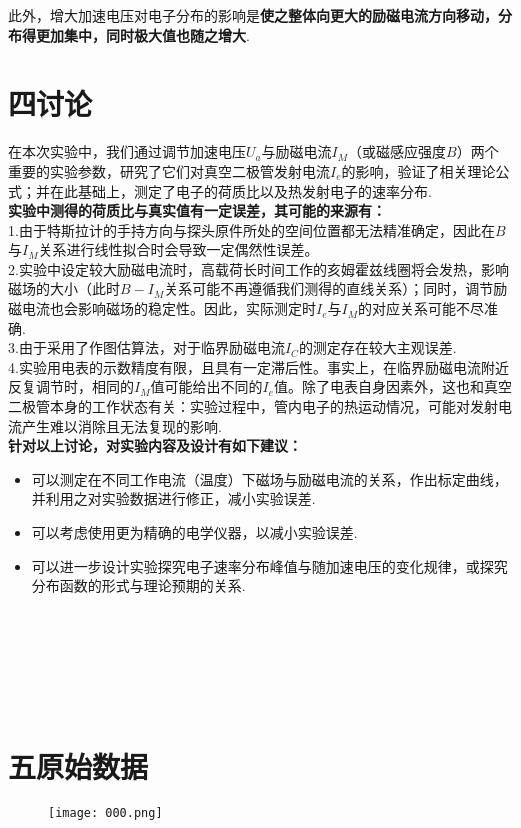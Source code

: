 \documentclass{ctexart}
\begin{document}
\noindent 此外，增大加速电压对电子分布的影响是\textbf{使之整体向更大的励磁电流方向移动，分布得更加集中，同时极大值也随之增大}.
  
\section*{四\quad 讨论}
在本次实验中，我们通过调节加速电压$U_a$与励磁电流$I_M$（或磁感应强度$B$）两个重要的实验参数，研究了它们对真空二极管发射电流$I_e$的影响，验证了相关理论公式；并在此基础上，测定了电子的荷质比以及热发射电子的速率分布.\\ 
\noindent \textbf{实验中测得的荷质比与真实值有一定误差，其可能的来源有：}\\
\noindent 1.由于特斯拉计的手持方向与探头原件所处的空间位置都无法精准确定，因此在$B$与$I_M$关系进行线性拟合时会导致一定偶然性误差。\\
\noindent 2.实验中设定较大励磁电流时，高载荷长时间工作的亥姆霍兹线圈将会发热，影响磁场的大小（此时$B-I_M$关系可能不再遵循我们测得的直线关系）；同时，调节励磁电流也会影响磁场的稳定性。因此，实际测定时$I_e$与$I_M$的对应关系可能不尽准确.\\
\noindent 3.由于采用了作图估算法，对于临界励磁电流$I_C$的测定存在较大主观误差.\\
\noindent 4.实验用电表的示数精度有限，且具有一定滞后性。事实上，在临界励磁电流附近反复调节时，相同的$I_M$值可能给出不同的$I_e$值。除了电表自身因素外，这也和真空二极管本身的工作状态有关：实验过程中，管内电子的热运动情况，可能对发射电流产生难以消除且无法复现的影响.\\
\clearpage
\textbf{针对以上讨论，对实验内容及设计有如下建议：}
\begin{itemize}
  \item 可以测定在不同工作电流（温度）下磁场与励磁电流的关系，作出标定曲线，并利用之对实验数据进行修正，减小实验误差.\\
  \item 可以考虑使用更为精确的电学仪器，以减小实验误差.\\
  \item 可以进一步设计实验探究电子速率分布峰值与随加速电压的变化规律，或探究分布函数的形式与理论预期的关系.
\end{itemize}


\quad\\
\quad\\
\quad\\
\quad\\
\quad\\

\section*{五\quad 原始数据}

\begin{figure}[H]
  \centering
   \texttt{[image: 000.png]}
   
 \end{figure}
\end{document}
